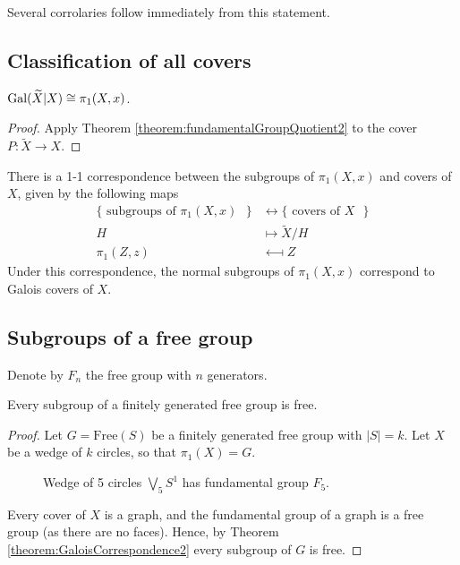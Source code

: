 Several corrolaries follow immediately from this statement.












\subsection{Classification of all covers}



\begin{proposition}
  $\Gal(\widetilde{X} | X) \cong \pi_1(X,x)$.
\end{proposition}
\begin{proof}
  Apply Theorem \ref{theorem:fundamentalGroupQuotient2} to the cover $P:\widetilde{X} \rightarrow X$.
\end{proof}

\begin{theorem}
  \label{theorem:GaloisCorrespondence2}
  There is a 1-1 correspondence between the subgroups of $\pi_1(X,x)$ and covers of $X$, given by the following maps
  \begin{align*}
    \{\mbox{ subgroups of $\pi_1(X,x)$ } \} &\longleftrightarrow  \{\mbox{ covers of $X$ } \}\\
    H &\longmapsto \widetilde{X}/H \\
    \pi_1(Z,z) & \longmapsfrom Z
  \end{align*}
  Under this correspondence, the normal subgroups of $\pi_1(X,x)$ correspond to Galois covers of $X$.
\end{theorem}






\subsection{Subgroups of a free group}
Denote by $F_n$ the free group with $n$ generators.
\begin{theorem}
  Every subgroup of a finitely generated free group is free.
\end{theorem}
\begin{proof}
  Let $G = \mathrm{Free}(S)$ be a finitely generated free group with $|S|=k$.
  Let $X$ be a wedge of $k$ circles, so that $\pi_1(X) = G$.
  \begin{figure}[H]
    \centering
    \begin{tikzpicture}[scale=0.5]
     
    \end{tikzpicture}
    \caption{Wedge of 5 circles $\bigvee \limits_5 S^1$ has fundamental group $F_5$.}
  \end{figure}
  Every cover of $X$ is a graph, and the fundamental group of a graph is a free group (as there are no faces).
  Hence, by Theorem \ref{theorem:GaloisCorrespondence2} every subgroup of $G$ is free.
\end{proof}







